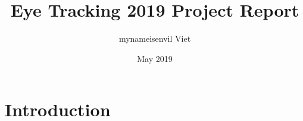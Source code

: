 \documentclass{article}
\title{Eye Tracking 2019 Project Report}
\author{mynameisenvil Viet}
\date{May 2019}
\begin{document}
\maketitle

\section{Introduction}
\end{document}
